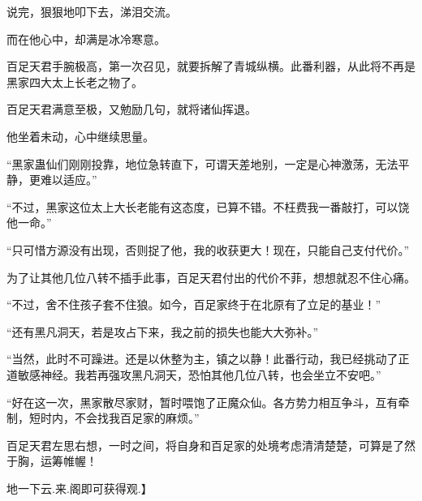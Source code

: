 \begin{this_body}
说完，狠狠地叩下去，涕泪交流。

而在他心中，却满是冰冷寒意。

百足天君手腕极高，第一次召见，就要拆解了青城纵横。此番利器，从此将不再是黑家四大太上长老之物了。

百足天君满意至极，又勉励几句，就将诸仙挥退。

他坐着未动，心中继续思量。

“黑家蛊仙们刚刚投靠，地位急转直下，可谓天差地别，一定是心神激荡，无法平静，更难以适应。”

“不过，黑家这位太上大长老能有这态度，已算不错。不枉费我一番敲打，可以饶他一命。”

“只可惜方源没有出现，否则捉了他，我的收获更大！现在，只能自己支付代价。”

为了让其他几位八转不插手此事，百足天君付出的代价不菲，想想就忍不住心痛。

“不过，舍不住孩子套不住狼。如今，百足家终于在北原有了立足的基业！”

“还有黑凡洞天，若是攻占下来，我之前的损失也能大大弥补。”

“当然，此时不可躁进。还是以休整为主，镇之以静！此番行动，我已经挑动了正道敏感神经。我若再强攻黑凡洞天，恐怕其他几位八转，也会坐立不安吧。”

“好在这一次，黑家散尽家财，暂时喂饱了正魔众仙。各方势力相互争斗，互有牵制，短时内，不会找我百足家的麻烦。”

百足天君左思右想，一时之间，将自身和百足家的处境考虑清清楚楚，可算是了然于胸，运筹帷幄！

地一下云.来.阁即可获得观.】

\end{this_body}


